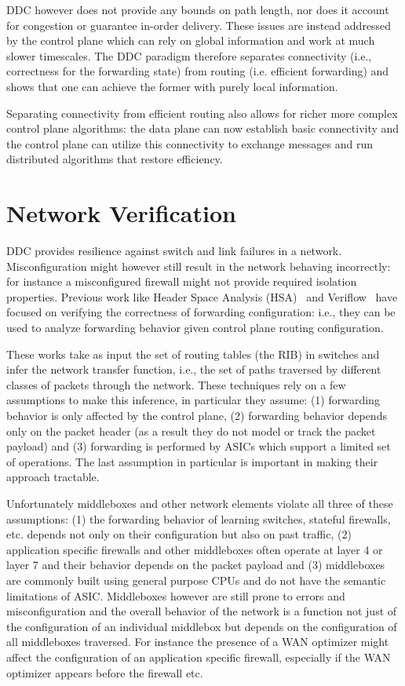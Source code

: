 \documentclass[letterpaper]{article}
\begin{document}
DDC however does not provide any bounds on path length, nor does it account for congestion or guarantee in-order
delivery. These issues are instead addressed by the control plane which can rely on global information and work at much
slower timescales. The DDC paradigm therefore separates connectivity (i.e., correctness for the forwarding state) from
routing (i.e. efficient forwarding) and shows that one can achieve the former with purely local information. 

Separating connectivity from efficient routing also allows for richer more complex control plane algorithms: the data
plane can now establish basic connectivity and the control plane can utilize this connectivity to exchange messages and
run distributed algorithms that restore efficiency.

\section*{Network Verification}
DDC provides resilience against switch and link failures in a network. Misconfiguration might however still result in
the network behaving incorrectly: for instance a misconfigured firewall might not provide required isolation properties.
Previous work like Header Space Analysis (HSA)~\cite{kazemian2012header} and Veriflow~\cite{khurshid13veriflow} have
focused on verifying the correctness of forwarding configuration: i.e., they can be used to analyze forwarding behavior
given control plane routing configuration.

These works take as input the set of routing tables (the RIB) in switches and infer the network transfer function, i.e.,
the set of paths traversed by different classes of packets through the network. These techniques rely on a few
assumptions to make this inference, in particular they assume: (1) forwarding behavior is only affected by the control
plane, (2) forwarding behavior depends only on the packet header (as a result they do not model or track the packet
payload) and (3) forwarding is performed by ASICs which support a limited set of operations. The last assumption in
particular is important in making their approach tractable.

Unfortunately middleboxes and other network elements violate all three of these assumptions: (1) the forwarding behavior
of learning switches, stateful firewalls, etc. depends not only on their configuration but also on past traffic, (2)
application specific firewalls and other middleboxes often operate at layer 4 or layer 7 and their behavior depends on
the packet payload and (3) middleboxes are commonly built using general purpose CPUs and do not have the semantic
limitations of ASIC. Middleboxes however are still prone to errors and misconfiguration and the overall behavior of the
network is a function not just of the configuration of an individual middlebox but depends on the configuration of all
middleboxes traversed. For instance the presence of a WAN optimizer might affect the configuration of an application
specific firewall, especially if the WAN optimizer appears before the firewall etc. 
\end{document}
